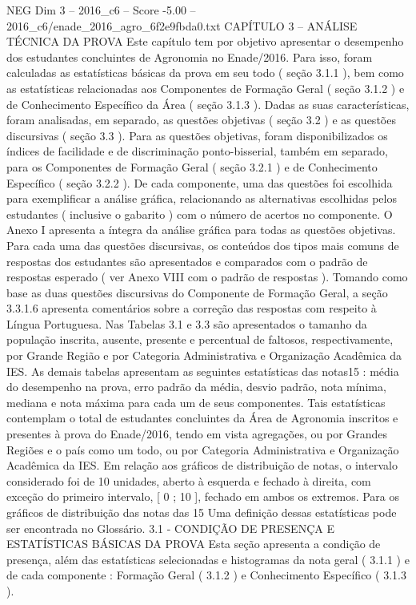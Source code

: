 \begin{textsample}{NEG Dim 3 – 2016\_c6 – Score -5.00 – 2016\_c6/enade\_2016\_agro\_6f2e9fbda0.txt}  \label{ex:f3_neg_032}
CAPÍTULO 3 – ANÁLISE TÉCNICA DA PROVA Este capítulo tem por objetivo apresentar o desempenho dos estudantes concluintes de Agronomia no Enade/2016.
Para isso, foram calculadas as estatísticas básicas da prova em seu todo ( seção 3.1.1 ), bem como as estatísticas relacionadas aos Componentes de Formação Geral ( seção 3.1.2 ) e de Conhecimento Específico da Área ( seção 3.1.3 ).
Dadas as suas características, foram analisadas, em separado, as questões objetivas ( seção 3.2 ) e as questões discursivas ( seção 3.3 ).
Para as questões objetivas, foram disponibilizados os índices de facilidade e de discriminação ponto-bisserial, também em separado, para os Componentes de Formação Geral ( seção 3.2.1 ) e de Conhecimento Específico ( seção 3.2.2 ).
De cada componente, uma das questões foi escolhida para exemplificar a análise gráfica, relacionando as alternativas escolhidas pelos estudantes ( inclusive o gabarito ) com o número de acertos no componente.
O Anexo I apresenta a íntegra da análise gráfica para todas as questões objetivas.
Para cada uma das questões discursivas, os conteúdos dos tipos mais comuns de respostas dos estudantes são apresentados e comparados com o padrão de respostas esperado ( ver Anexo VIII com o padrão de respostas ).
Tomando como base as duas questões discursivas do Componente de Formação Geral, a seção 3.3.1.6 apresenta comentários sobre a correção das respostas com respeito à Língua Portuguesa.
Nas Tabelas 3.1 e 3.3 são apresentados o tamanho da população inscrita, ausente, presente e percentual de faltosos, respectivamente, por Grande Região e por Categoria Administrativa e Organização Acadêmica da IES.
As demais tabelas apresentam as seguintes estatísticas das notas15 : média do desempenho na prova, erro padrão da média, desvio padrão, nota mínima, mediana e nota máxima para cada um de seus componentes.
Tais estatísticas contemplam o total de estudantes concluintes da Área de Agronomia inscritos e presentes à prova do Enade/2016, tendo em vista agregações, ou por Grandes Regiões e o país como um todo, ou por Categoria Administrativa e Organização Acadêmica da IES.
Em relação aos gráficos de distribuição de notas, o intervalo considerado foi de 10 unidades, aberto à esquerda e fechado à direita, com exceção do primeiro intervalo, [ 0 ; 10 ], fechado em ambos os extremos.
Para os gráficos de distribuição das notas das 15 Uma definição dessas estatísticas pode ser encontrada no Glossário. 3.1 - CONDIÇÃO DE PRESENÇA E ESTATÍSTICAS BÁSICAS DA PROVA Esta seção apresenta a condição de presença, além das estatísticas selecionadas e histogramas da nota geral ( 3.1.1 ) e de cada componente : Formação Geral ( 3.1.2 ) e Conhecimento Específico ( 3.1.3 ).

\end{textsample}
